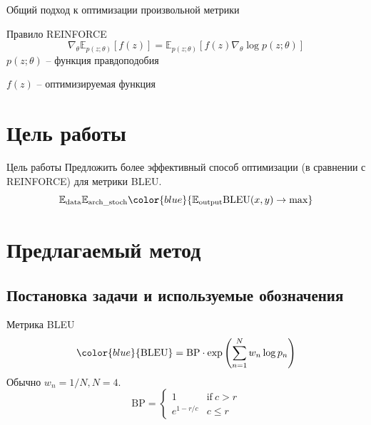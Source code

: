 \documentclass{beamer}					%
\begin{document}
     \begin{frame}{Общий подход к оптимизации произвольной метрики}
        \begin{block}{Правило REINFORCE}
        $$ \nabla_\theta \mathbb{E}_{p(z;\theta)}[f(z)] = \mathbb{E}_{p(z;\theta)}[f(z)\nabla_\theta \log p(z;\theta)] $$
        $ p(z; \theta) $ -- функция правдоподобия

        $ f(z) $ -- оптимизируемая функция
        \end{block}
    \end{frame}

    \section{Цель работы}
    \begin{frame}{Цель работы}
        Предложить более эффективный способ оптимизации (в сравнении с REINFORCE) для метрики BLEU.
        \vfill
        \begin{equation}
            \mathbb{E}_{\mathrm{data}} \mathbb{E}_{\mathrm{arch\_stoch}}  \color{blue}{\mathbb{E}_{\mathrm{output}} \textnormal{BLEU}(x, y) \to \max} 
        \end{equation}
    \end{frame}

    \section{Предлагаемый метод}
    \subsection{Постановка задачи и используемые обозначения}
    \begin{frame}{Метрика BLEU}
        \begin{equation}
            {\color{blue}{\textrm{BLEU}}=\textrm{BP} \cdot \exp \left(\sum\limits_{n=1}^N{w_n \log p_n}\right)}
        \end{equation}
        Обычно $w_n = 1/N, N = 4$.
        \vfill
        \begin{equation}
            \textrm{BP} =
            \begin{cases}
            1 & \text{if}\ c>r \\
            e^{1 - r/c} & c \le r
            \end{cases}
        \end{equation}
    \end{frame}
\end{document}
